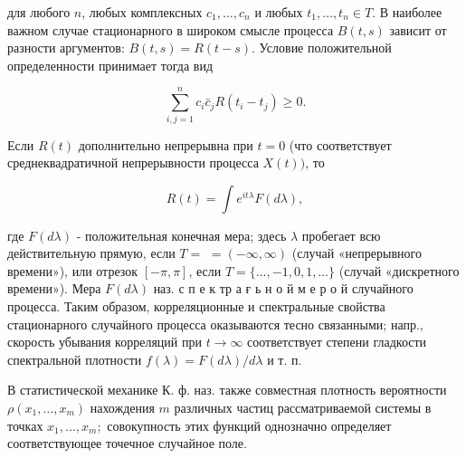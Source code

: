 \documentclass[10pt]{article}
\begin{document}
для любого $n$, любых комплексных $c_{1}, \ldots, c_{n}$ и любых $t_{1}, \ldots, t_{n} \in T$. В наиболее важном случае стационарного в широком смысле процесса $B(t, s)$ зависит от разности аргументов: $B(t, s)=R(t-s)$. Условие положительной определенности принимает тогда вид



\[

\sum_{i, j=1}^{n} c_{i} \bar{c}_{j} R\left(t_{i}-t_{j}\right) \geqslant 0 .

\]



Если $R(t)$ дополнительно непрерывна при $t=0$ (что соответствует среднеквадратичной непрерывности процесса $X(t))$, то



\[

R(t)=\int e^{i t \lambda} F(d \lambda),

\]



где $F(d \lambda)$ - положительная конечная мера; здесь $\lambda$ пробегает всю действительную прямую, если $T=$ $=(-\infty, \infty)$ (случай «непрерывного времени»), или отрезок $[-\pi, \pi]$, если $T=\{\ldots,-1,0,1, \ldots\}$ (случай «дискретного времени»). Мера $F(d \lambda)$ наз. с п е к тр а ғ ь н о й м е р о й случайного процесса. Таким образом, корреляционные и спектральные свойства стационарного случайного процесса оказываются тесно связанными; напр., скорость убывания корреляций при $t \rightarrow \infty$ соответствует степени гладкости спектральной плотности $f(\lambda)=F(d \lambda) / d \lambda$ и т. п.



В статистической механике $К$. ф. наз. также совместная плотность вероятности $\rho\left(x_{1}, \ldots, x_{m}\right)$ нахождения $m$ различных частиц рассматриваемой системы в точках $x_{1}, \ldots, x_{m} ;$ совокупность этих функций однозначно определяет соответствующее точечное случайное поле.
\end{document}

